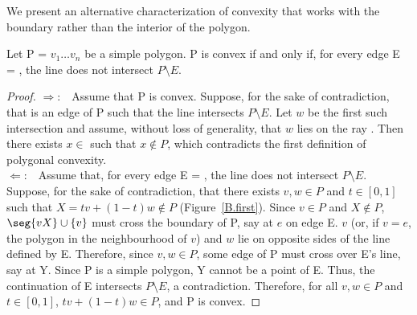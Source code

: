 We present an alternative characterization of convexity that works
with the boundary rather than the interior of the polygon.
%
%
\begin{lemma}
\label{conv3}
Let P = $v_{1} \ldots v_{n}$ be a simple polygon.
P is convex if and only if, 
for every edge E = 
, the line  does not intersect
$P \setminus E$.
\end{lemma}
%
\begin{proof}
$\Rightarrow$:\ \ Assume that P is convex.  
Suppose, for the sake of contradiction, that 
is an edge of P such that the line 
intersects $P\setminus E$.
Let $w$ be the first such intersection
and assume, without loss of generality, 
that $w$ lies on the ray .
Then there exists $x \in$  such that $x \not\in P$,
which contradicts the first definition of polygonal convexity.\\
$\Leftarrow$:\ \ Assume that, for every edge E = 
, the line  does not intersect
$P \setminus E$.
Suppose, for the sake of contradiction, that there exists \mbox{$v,w \in P$} and 
\mbox{$t \in [0,1]$} such that \mbox{\(X = tv + (1-t)w \not\in P\)} 
(Figure~\ref{B.first}).
Since $v \in P$ and $X \not\in P$,
$\seg{vX} \cup \{v\}$ must cross the boundary of P, say at $e$ on edge E.
$v$ (or, if $v=e$, the polygon in the neighbourhood of $v$) 
and $w$ lie on opposite sides of the line defined by E.
Therefore, since $v,w \in P$,  some edge of P must cross over
E's line, say at Y.
Since P is a simple polygon, Y cannot be a point of E.
Thus, the continuation of E intersects $P \setminus E$, a
contradiction.
Therefore, for all $v,w \in P$ and $t \in [0,1]$, 
\mbox{$tv + (1-t)w \in P$}, and P is convex.
\end{proof}
%

